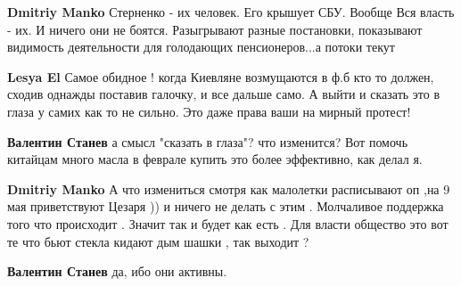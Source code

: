 \begin{itemize}
\begin{itemize}
\textbf{Dmitriy Manko} Стерненко - их человек. Его крышует СБУ. Вообще Вся власть - их. И ничего они не боятся. Разыгрывают разные постановки, показывают видимость деятельности для голодающих пенсионеров...а потоки текут

 
\textbf{Lesya El} Самое обидное ! когда Киевляне возмущаются в ф.б кто то должен, сходив однажды поставив галочку, и все дальше само. А выйти и сказать это в глаза у самих как то не сильно. Это даже права ваши на мирный протест!

 
\textbf{Валентин Станев} а смысл "сказать в глаза"? что изменится? Вот помочь китайцам много масла в феврале купить это более эффективно, как делал я.

 
\textbf{Dmitriy Manko} А что измениться смотря как малолетки расписывают оп ,на 9 мая приветствуют Цезаря )) и ничего не делать с этим . Молчаливое поддержка того что происходит . Значит так и будет как есть . Для власти общество это вот те что бьют стекла кидают дым шашки , так выходит ?

 
\textbf{Валентин Станев} да, ибо они активны.

 

\end{itemize}
\end{itemize}
